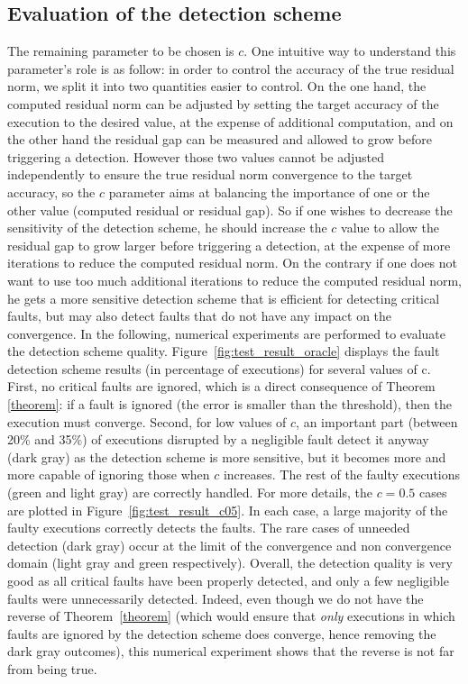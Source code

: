 \documentclass[twoside]{article}
\newcounter{fig}\setcounter{fig}{0}
\begin{document}
  \subsection{Evaluation of the detection scheme}\label{sec:evaluation_oracle}
  The remaining parameter to be chosen is $c$. One intuitive way to understand this parameter's role is as follow: in order to control the accuracy of the true residual norm, we split it into two quantities easier to control. On the one hand, the computed residual norm can be adjusted by setting the target accuracy of the execution to the desired value, at the expense of additional computation, and on the other hand the residual gap can be measured and allowed to grow before triggering a detection. However those two values cannot be adjusted independently to ensure the true residual norm convergence to the target accuracy, so the $c$ parameter aims at balancing the importance of one or the other value (computed residual or residual gap). So if one wishes to decrease the sensitivity of the detection scheme, he should increase the $c$ value to allow the residual gap to grow larger before triggering a detection, at the expense of more iterations to reduce the computed residual norm. On the contrary if one does not want to use too much additional iterations to reduce the computed residual norm, he gets a more sensitive detection scheme that is efficient for detecting critical faults, but may also detect faults that do not have any impact on the convergence.
  In the following, numerical experiments are performed to evaluate the detection scheme quality. Figure~\ref{fig:test_result_oracle} displays the fault detection scheme results (in percentage of executions) for several values of c.
  First, no critical faults are ignored, which is a direct consequence of Theorem \ref{theorem}: if a fault is ignored (the error is smaller than the threshold), then the execution must converge. Second, for low values of $c$, an important part (between 20\% and 35\%) of executions disrupted by a negligible fault detect it anyway (dark gray) as the detection scheme is more sensitive, but it becomes more and more capable of ignoring those when $c$ increases. The rest of the faulty executions (green and light gray) are correctly handled.
  For more details, the $c=0.5$ cases are plotted in Figure~\ref{fig:test_result_c05}. In each case, a large majority of the faulty executions correctly detects the faults. The rare cases of unneeded detection (dark gray) occur at the limit of the convergence and non convergence domain (light gray and green respectively).
  Overall, the detection quality is very good as all critical faults have been properly detected, and only a few negligible faults were unnecessarily detected. Indeed, even though we do not have the reverse of Theorem~\ref{theorem} (which would ensure that \emph{only} executions in which faults are ignored by the detection scheme does converge, hence removing the dark gray outcomes), this numerical experiment shows that the reverse is not far from being true.
\end{document}
